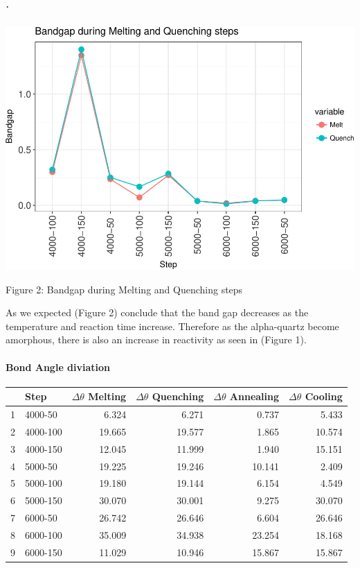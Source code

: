 \documentclass[]{article}
\let\oldparagraph\paragraph
\renewcommand{\paragraph}[1]{\oldparagraph{#1}\mbox{}}
\let\oldsubparagraph\subparagraph
\renewcommand{\subparagraph}[1]{\oldsubparagraph{#1}\mbox{}}
\begin{document}
\hypertarget{section-1}{%
\subparagraph{.}\label{section-1}}

\includegraphics{merge_files/figure-latex/Graph: Bandgap Melt Quenching-1.pdf}

Figure 2: Bandgap during Melting and Quenching steps

As we expected (Figure 2) conclude that the band gap decreases as the
temperature and reaction time increase. Therefore as the alpha-quartz
become amorphous, there is also an increase in reactivity as seen in
(Figure 1).

\hypertarget{bond-angle-diviation}{%
\paragraph{Bond Angle diviation}\label{bond-angle-diviation}}

\begin{longtable}[]{@{}llrrrr@{}}
\toprule
& Step & \(\Delta\theta\) Melting & \(\Delta\theta\) Quenching &
\(\Delta\theta\) Annealing & \(\Delta\theta\) Cooling\tabularnewline
\midrule
\endhead
1 & 4000-50 & 6.324 & 6.271 & 0.737 & 5.433\tabularnewline
2 & 4000-100 & 19.665 & 19.577 & 1.865 & 10.574\tabularnewline
3 & 4000-150 & 12.045 & 11.999 & 1.940 & 15.151\tabularnewline
4 & 5000-50 & 19.225 & 19.246 & 10.141 & 2.409\tabularnewline
5 & 5000-100 & 19.180 & 19.144 & 6.154 & 4.549\tabularnewline
6 & 5000-150 & 30.070 & 30.001 & 9.275 & 30.070\tabularnewline
7 & 6000-50 & 26.742 & 26.646 & 6.604 & 26.646\tabularnewline
8 & 6000-100 & 35.009 & 34.938 & 23.254 & 18.168\tabularnewline
9 & 6000-150 & 11.029 & 10.946 & 15.867 & 15.867\tabularnewline
\bottomrule
\end{longtable}
\end{document}
